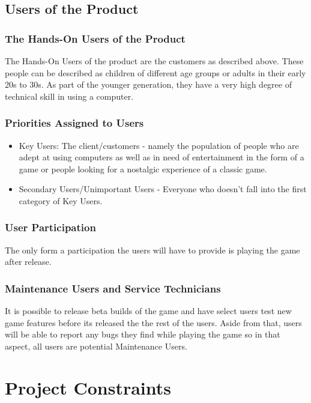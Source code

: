\documentclass[12pt, titlepage]{article}
\begin{document}
\subsection{Users of the Product}
\subsubsection{The Hands-On Users of the Product}
The Hands-On Users of the product are the customers as described above. These people can be described as children of different age groups or adults in their early 20s to 30s. As part of the younger generation, they have a very high degree of technical skill in using a computer.
\subsubsection{Priorities Assigned to Users}
\begin{itemize}
    \item Key Users: The client/customers - namely the population of people who are adept at using computers as well as in need of entertainment in the form of a game or people looking for a nostalgic experience of a classic game.
    \item Secondary Users/Unimportant Users - Everyone who doesn't fall into the first category of Key Users.
\end{itemize}

\subsubsection{User Participation}
The only form a participation the users will have to provide is playing the game after release.

\subsubsection{Maintenance Users and Service Technicians}

It is possible to release beta builds of the game and have select users test new game features before its released the the rest of the users. Aside from that, users will be able to report any bugs they find while playing the game so in that aspect, all users are potential Maintenance Users.

\section{Project Constraints}
\end{document}
